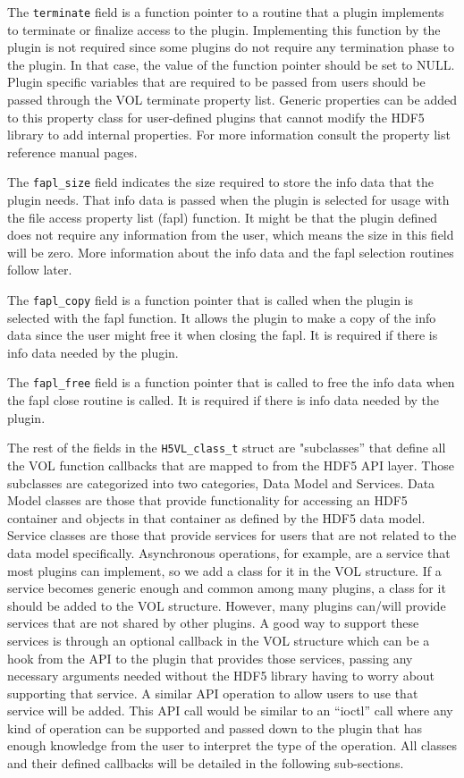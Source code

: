 The \texttt{terminate} field is a function pointer to a routine that a plugin implements to terminate or finalize access to the plugin. Implementing this function by the plugin is not required since some plugins do not require any termination phase to the plugin. In that case, the value of the function pointer should be set to NULL. Plugin specific variables that are required to be passed from users should be passed through the VOL terminate property list. Generic properties can be added to this property class for user-defined plugins that cannot modify the HDF5 library to add internal properties. For more information consult the property list reference manual pages.

The \texttt{fapl\_size} field indicates the size required to store the
info data that the plugin needs. That info data is passed when the
plugin is selected for usage with the file access property list (fapl)
function. It might be that the plugin defined does not require any
information from the user, which means the size in this field will be
zero. More information about the info data and the fapl selection
routines follow later.

The \texttt{fapl\_copy} field is a function pointer that is called when
the plugin is selected with the fapl function. It allows the plugin to
make a copy of the info data since the user might free it when closing
the fapl. It is required if there is info data needed by the plugin.

The \texttt{fapl\_free} field is a function pointer that is called to
free the info data when the fapl close routine is called. It is
required if there is info data needed by the plugin.

The rest of the fields in the \texttt{H5VL\_class\_t} struct are "subclasses'' that define all the VOL function callbacks that
are mapped to from the HDF5 API layer. Those subclasses are categorized into two categories, Data Model and Services. Data Model classes are those that provide functionality for accessing an HDF5 container and objects in that container as defined by the HDF5 data model.  Service classes are those that provide services for users that are not related to the data model specifically. Asynchronous operations, for example, are a service that most plugins can implement, so we add a class for it in the VOL structure. If a service becomes generic enough and common among many plugins, a class for it should be added to the VOL structure. However, many plugins can/will provide services that are not shared by other plugins. A good way to support these services is through an optional callback in the VOL structure which can be a hook from the API to the plugin that provides those services, passing any necessary arguments needed without the HDF5 library having to worry about supporting that service. A similar API operation to allow users to use that service will be added. This API call would be similar to an “ioctl” call where any kind of operation can be supported and passed down to the plugin that has enough knowledge from the user to interpret the type of the operation. All classes and their defined callbacks will be detailed in the following sub-sections.

